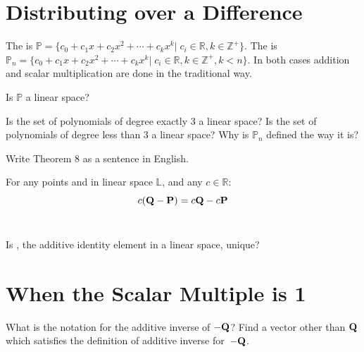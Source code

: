 \section{Distributing over a Difference }    \label{Distributing over a Difference}

\begin{defn}
	The  is $\mathbb{P}= \{ c_0+c_1x+c_2x^2+\cdots+c_kx^k | \; c_i \in \mathbb{R}, k \in \mathbb{Z}^+ \}$. The  is $\mathbb{P}_n = \{ c_0+c_1x+c_2x^2+\cdots+c_kx^k | \; c_i \in \mathbb{R}, k \in \mathbb{Z}^+, k<n \}$. In both cases addition and scalar multiplication are done in the traditional way. 
\end{defn}

\begin{myexa}[\bd{a}]
	 Is $\mathbb{P}$ a linear space?
\end{myexa}


\begin{myexb}[\bd{b}]
	Is the set of polynomials of degree exactly 3 a linear space? Is the set of polynomials of degree less than 3 a linear space?  Why is $\mathbb{P}_n$ defined the way it is?
\end{myexb}

\begin{myexc}[\bd{c}]
	Write Theorem 8 as a sentence in English.
\end{myexc}

\begin{theorem}
	For any points  and  in linear space $\mathbb{L}$, and any  $c\in\mathbb{R}$:
	\[c(\textbf{Q}-\textbf{P})=c\textbf{Q}-c\textbf{P}\]
	\\
\end{theorem}
\vspace{-.3in}\hspace{5in}\begin{annotation}
\end{annotation}

\noindent {}  Is , the additive identity element in a linear space, unique?

\section{When the Scalar Multiple is 1}    \label{When the Scalar Multiple is 1}

\begin{myexa}[\bd{a}]
	What is the notation for the additive inverse of $-\textbf{Q}$? Find a vector other than $\textbf{Q}$ which satisfies the definition of additive inverse for~$-\textbf{Q}$.
\end{myexa}

